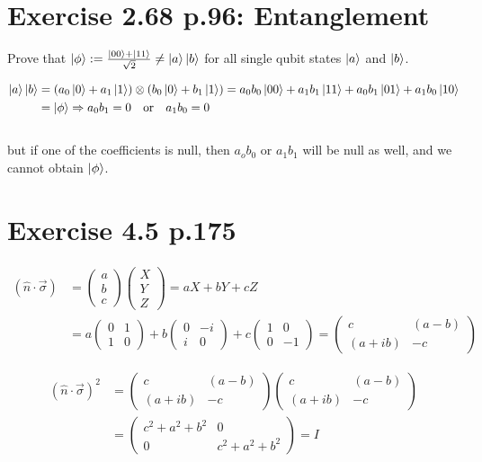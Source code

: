\documentclass[12pt]{article}
\begin{document}
\section{Exercise 2.68 p.96: Entanglement}

Prove that $\ket{\phi} := \frac{\ket{00} + \ket{11}}{\sqrt{2}} \neq \ket{a}\ket{b}$ for all single qubit states $\ket{a}$ and $\ket{b}$.

\begin{equation*}
\begin{aligned}
\ket{a}\ket{b} 
&= (a_0 \ket{0} + a_1 \ket{1}) \otimes (b_0 \ket{0} + b_1 \ket{1})
= a_0b_0 \ket{00} + a_1b_1 \ket{11} + a_0b_1 \ket{01} + a_1b_0 \ket{10} \\
&= \ket{\phi} \Rightarrow a_0b_1 = 0 \quad\mbox{or}\quad a_1b_0 = 0
\end{aligned}
\end{equation*}
\\
but if one of the coefficients is null, then $a_ob_0$ or $a_1b_1$ will be null as well, and we cannot obtain $\ket{\phi}$.

\section{Exercise 4.5 p.175}

\begin{equation*}
\begin{aligned}
(\hat{n} \cdot \vec{\sigma}) 
&= 
\begin{pmatrix} a \\ b \\ c \end{pmatrix}
\begin{pmatrix} X \\ Y \\ Z \end{pmatrix}
= aX + bY + cZ \\
&= a
\begin{pmatrix}
0 & 1 \\ 
1 & 0 
\end{pmatrix}
+ b
\begin{pmatrix}
0 & -i \\ 
i & 0 
\end{pmatrix}
+ c
\begin{pmatrix}
1 & 0 \\ 
0 & -1 
\end{pmatrix}
=
\begin{pmatrix}
c & (a-b) \\ 
(a+ib) & -c 
\end{pmatrix}
\end{aligned}
\end{equation*}

\begin{equation*}
\begin{aligned}
(\hat{n} \cdot \vec{\sigma})^2
&= 
\begin{pmatrix}
c & (a-b) \\ 
(a+ib) & -c 
\end{pmatrix}
\begin{pmatrix}
c & (a-b) \\ 
(a+ib) & -c 
\end{pmatrix} \\
&=
\begin{pmatrix}
c^2 + a^2 + b^2 & 0 \\ 
0 & c^2 + a^2 + b^2
\end{pmatrix}
= I
\end{aligned}
\end{equation*}
\end{document}
